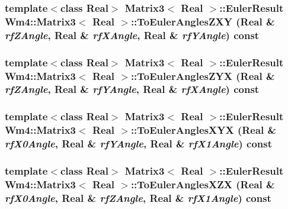 \subsubsection{\setlength{\rightskip}{0pt plus 5cm}template$<$class Real$>$ {\bf Matrix3}$<$ Real $>$::{\bf Euler\-Result} {\bf Wm4::Matrix3}$<$ Real $>$::To\-Euler\-Angles\-ZXY (Real \& {\em rf\-ZAngle}, Real \& {\em rf\-XAngle}, Real \& {\em rf\-YAngle}) const}\label{classWm4_1_1Matrix3_2ddf69b28792fab4012476ee22ad5f9f}


\subsubsection{\setlength{\rightskip}{0pt plus 5cm}template$<$class Real$>$ {\bf Matrix3}$<$ Real $>$::{\bf Euler\-Result} {\bf Wm4::Matrix3}$<$ Real $>$::To\-Euler\-Angles\-ZYX (Real \& {\em rf\-ZAngle}, Real \& {\em rf\-YAngle}, Real \& {\em rf\-XAngle}) const}\label{classWm4_1_1Matrix3_95bb42296cc030b4ee1a0adece17e089}


\subsubsection{\setlength{\rightskip}{0pt plus 5cm}template$<$class Real$>$ {\bf Matrix3}$<$ Real $>$::{\bf Euler\-Result} {\bf Wm4::Matrix3}$<$ Real $>$::To\-Euler\-Angles\-XYX (Real \& {\em rf\-X0Angle}, Real \& {\em rf\-YAngle}, Real \& {\em rf\-X1Angle}) const}\label{classWm4_1_1Matrix3_4705be43f544e4266002aefab9a47f93}


\subsubsection{\setlength{\rightskip}{0pt plus 5cm}template$<$class Real$>$ {\bf Matrix3}$<$ Real $>$::{\bf Euler\-Result} {\bf Wm4::Matrix3}$<$ Real $>$::To\-Euler\-Angles\-XZX (Real \& {\em rf\-X0Angle}, Real \& {\em rf\-ZAngle}, Real \& {\em rf\-X1Angle}) const}\label{classWm4_1_1Matrix3_c940ce2efcd15ab642ad225bc62e9bfc}


